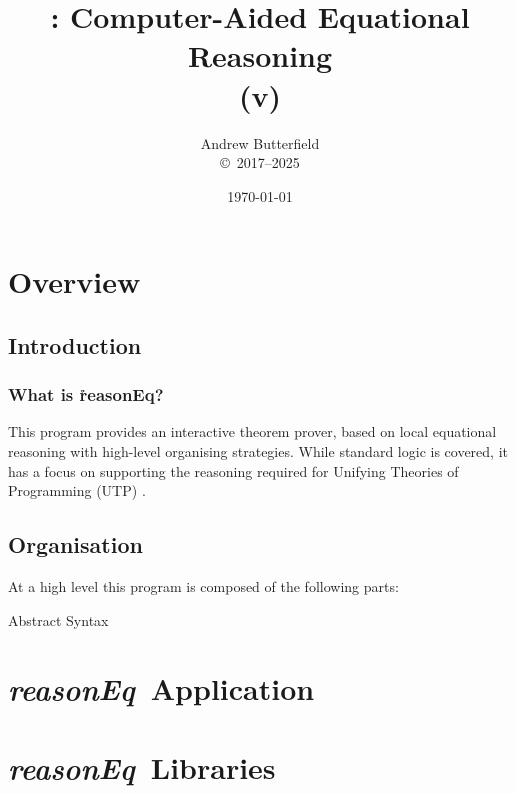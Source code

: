 \documentclass[fleqn,10pt]{report}
\author{
Andrew Butterfield
\\
{\small \copyright\ 2017--2025}
}
\title{
  \reasonEq: Computer-Aided Equational Reasoning
  \\(v\reqVersion)
}
\date{
\today
}
\def\reasonEq{\textit{\textsf{reasonEq}}}
\begin{document}
\maketitle
\setcounter{tocdepth}{2}
\tableofcontents

\part{Overview}

\chapter{Introduction}

\section{What is \h{reasonEq}?}

This program provides an interactive theorem prover,
based on local equational reasoning with high-level organising strategies.
While standard logic is covered, 
it has a focus on supporting the reasoning required for
Unifying Theories of Programming (UTP) \cite{UTP-book}.

\chapter{Organisation}

At a high level this program is composed of the following parts:
\begin{description}
  \item[Abstract Syntax] 
\end{description}

\part{\reasonEq\ Application}


% 

\part{\reasonEq\ Libraries}


\end{document}
